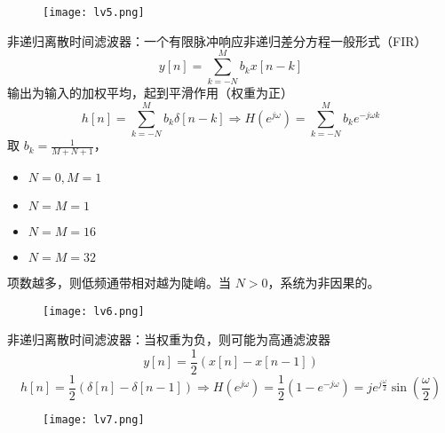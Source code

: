 \documentclass[UTF8]{report}
\theoremstyle{MyLineTheoremStyle} %
\theoremstyle{MyBlockTheoremStyle} %
\theoremstyle{MySubsubsectionStyle} %
\begin{document}
\begin{figure}[H]
    \centering
    \texttt{[image: lv5.png]} %
\end{figure}

非递归离散时间滤波器：一个有限脉冲响应非递归差分方程一般形式（FIR）
\[
y[n] = \sum_{k=-N}^{M} b_k x[n-k]
\]
输出为输入的加权平均，起到平滑作用（权重为正）
\[
h[n] = \sum_{k=-N}^{M} b_k \delta[n-k] \Rightarrow H(e^{j\omega}) = \sum_{k=-N}^{M} b_k e^{-j\omega k}
\]
取 $b_k = \frac{1}{M+N+1}$，
\begin{itemize}
    \item $N = 0, M = 1$
    \item $N = M = 1$
    \item $N = M = 16$
    \item $N = M = 32$
\end{itemize}
项数越多，则低频通带相对越为陡峭。当 $N > 0$，系统为非因果的。

\begin{figure}[H]
    \centering
    \texttt{[image: lv6.png]} %
\end{figure}

非递归离散时间滤波器：当权重为负，则可能为高通滤波器
\[
y[n] = \frac{1}{2} \left( x[n] - x[n-1] \right)
\]
\[
h[n] = \frac{1}{2} \left( \delta[n] - \delta[n-1] \right) \Rightarrow H(e^{j\omega}) = \frac{1}{2} \left( 1 - e^{-j\omega} \right) = je^{j\frac{\omega}{2}} \sin \left( \frac{\omega}{2} \right)
\]

\begin{figure}[H]
    \centering
    \texttt{[image: lv7.png]} %
\end{figure}
\end{document}
